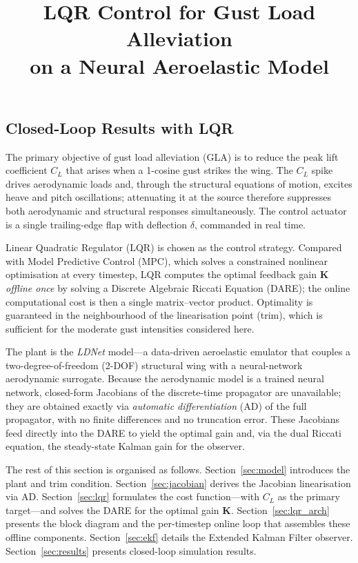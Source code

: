 \documentclass[11pt,a4paper]{article}
\title{LQR Control for Gust Load Alleviation\\on a Neural Aeroelastic Model}
\author{}
\date{}
\newcommand{\mK}{\mathbf{K}}
\begin{document}
\maketitle

\subsection{Closed-Loop Results with LQR}

The primary objective of gust load alleviation (GLA) is to reduce the peak
lift coefficient $C_L$ that arises when a 1-cosine gust strikes the wing.
The $C_L$ spike drives aerodynamic loads and, through the structural equations
of motion, excites heave and pitch oscillations; attenuating it at the source
therefore suppresses both aerodynamic and structural responses simultaneously.
The control actuator is a single trailing-edge flap with deflection $\delta$,
commanded in real time.

Linear Quadratic Regulator (LQR) is chosen as the control strategy.
Compared with Model Predictive Control (MPC), which solves a constrained
nonlinear optimisation at every timestep, LQR computes the optimal feedback
gain $\mK$ \emph{offline once} by solving a Discrete Algebraic Riccati Equation
(DARE); the online computational cost is then a single matrix--vector product.
Optimality is guaranteed in the neighbourhood of the linearisation point (trim),
which is sufficient for the moderate gust intensities considered here.

The plant is the \emph{LDNet} model---a data-driven aeroelastic emulator that
couples a two-degree-of-freedom (2-DOF) structural wing with a neural-network
aerodynamic surrogate.
Because the aerodynamic model is a trained neural network, closed-form Jacobians
of the discrete-time propagator are unavailable; they are obtained exactly via
\emph{automatic differentiation} (AD) of the full propagator, with no finite
differences and no truncation error.
These Jacobians feed directly into the DARE to yield the optimal gain and, via
the dual Riccati equation, the steady-state Kalman gain for the observer.

The rest of this section is organised as follows.
Section~\ref{sec:model} introduces the plant and trim condition.
Section~\ref{sec:jacobian} derives the Jacobian linearisation via AD.
Section~\ref{sec:lqr} formulates the cost function---with $C_L$ as the primary
target---and solves the DARE for the optimal gain $\mK$.
Section~\ref{sec:lqr_arch} presents the block diagram and the per-timestep
online loop that assembles these offline components.
Section~\ref{sec:ekf} details the Extended Kalman Filter observer.
Section~\ref{sec:results} presents closed-loop simulation results.
\end{document}
